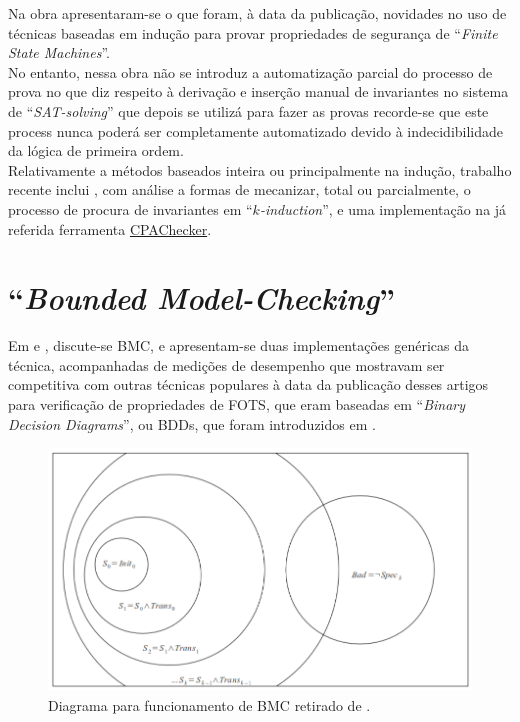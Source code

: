 \documentclass[11pt,a4paper]{report}%
\def\bmc{``\textit{Bounded Model-Checking}''\xspace}
\def\kind{``\textit{$k$-induction}''\xspace}
\def\cpa{\href{https://cpachecker.sosy-lab.org/}{CPAChecker\xspace}}
\begin{document}
Na obra \cite{kind_original} apresentaram-se o que foram, à data da publicação, novidades
no uso de técnicas baseadas em indução para provar propriedades de segurança de
``\textit{Finite State Machines}''.\\
No entanto, nessa obra não se introduz a automatização parcial do processo de prova
no que diz respeito à derivação e inserção manual de invariantes no sistema de
``\textit{SAT-solving}'' que depois se utilizá para fazer as provas \textemdash
recorde-se que este process nunca poderá ser completamente automatizado devido à
indecidibilidade da lógica de primeira ordem.
\\

Relativamente a métodos baseados inteira ou principalmente na indução, trabalho recente inclui
\cite{kind_state_of_art}, com análise a formas de mecanizar, total ou parcialmente, o processo
de procura de invariantes em \kind, e uma implementação na já referida ferramenta \cpa. 

\section{\bmc}
\label{state_of_art:bmc}

Em \cite{bmc} e \cite{bmc2}, discute-se BMC, e apresentam-se duas implementações genéricas da
técnica, acompanhadas de medições de desempenho que mostravam ser competitiva com outras técnicas
populares à data da publicação desses artigos para verificação de propriedades de FOTS,
que eram baseadas em ``\textit{Binary Decision Diagrams}'', ou BDDs, que foram introduzidos em \cite{bdd}.

\begin{figure}[H]
      \centering
      \includegraphics[scale=1]{bmc_example.png}
      \caption{Diagrama para funcionamento de BMC retirado de \cite[p. 16 ]{bachelor_thesis}.}
      \label{fig:bmc}
\end{figure}
\end{document}
